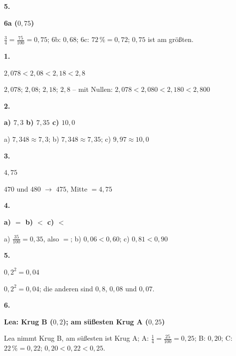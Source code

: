 \documentclass[11pt]{article}
\newcommand{\lsg}[3]{\par\noindent\begin{minipage}[t]{9mm}\textbf{#1}\end{minipage}%
  \begin{minipage}[t]{52mm}\raggedright\bfseries\boldmath #2\end{minipage}\hspace{3mm}%
  \begin{minipage}[t]{\dimexpr\linewidth-64mm\relax}\raggedright\small #3\end{minipage}\par\vspace{4pt}}
\begin{document}
\lsg{5.}{6a ($0{,}75$)}{$\frac{3}{4} = \frac{75}{100} = 0{,}75$; 6b: $0{,}68$; 6c: $72\,\% = 0{,}72$; $0{,}75$ ist am größten.}
\par\Needspace{25mm}\vspace{6pt}\noindent\colorbox{black!12}{}\hspace{2mm}{\bfseries Probetest}\par\vspace{4pt}
\lsg{1.}{$2{,}078 < 2{,}08 < 2{,}18 < 2{,}8$}{$2{,}078$; $2{,}08$; $2{,}18$; $2{,}8$ – mit Nullen: $2{,}078 < 2{,}080 < 2{,}180 < 2{,}800$}
\lsg{2.}{a) $7{,}3$ \quad b) $7{,}35$ \quad c) $10{,}0$}{a) $7{,}348 \approx 7{,}3$; b) $7{,}348 \approx 7{,}35$; c) $9{,}97 \approx 10{,}0$}
\lsg{3.}{$4{,}75$}{$470$ und $480$ $\to$ $475$, Mitte $= 4{,}75$}
\lsg{4.}{a) $=$ \quad b) $<$ \quad c) $<$}{a) $\frac{35}{100} = 0{,}35$, also $=$; b) $0{,}06 < 0{,}60$; c) $0{,}81 < 0{,}90$}
\lsg{5.}{$0{,}2^2 = 0{,}04$}{$0{,}2^2 = 0{,}04$; die anderen sind $0{,}8$, $0{,}08$ und $0{,}07$.}
\lsg{6.}{Lea: Krug B ($0{,}2$); am süßesten Krug A ($0{,}25$)}{Lea nimmt Krug B, am süßesten ist Krug A; A: $\frac{1}{4} = \frac{25}{100} = 0{,}25$; B: $0{,}20$; C: $22\,\% = 0{,}22$; $0{,}20 < 0{,}22 < 0{,}25$.}
\end{document}
